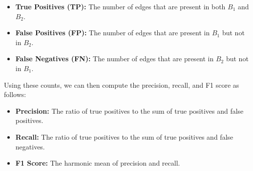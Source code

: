 \begin{itemize}
    \item \textbf{True Positives (TP):} The number of edges that are present in both $B_1$ and $B_2$.
    \item \textbf{False Positives (FP):} The number of edges that are present in $B_1$ but not in $B_2$.
    \item \textbf{False Negatives (FN):} The number of edges that are present in $B_2$ but not in $B_1$.
\end{itemize}

Using these counts, we can then compute the precision, recall, and F1 score as follows:

\begin{itemize}
    \item \textbf{Precision:} The ratio of true positives to the sum of true positives and false positives.
    \item \textbf{Recall:} The ratio of true positives to the sum of true positives and false negatives.
    \item \textbf{F1 Score:} The harmonic mean of precision and recall.
\end{itemize}